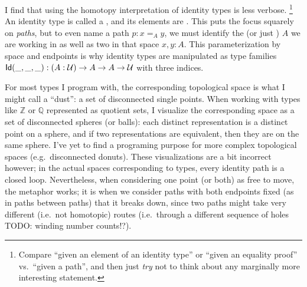 \documentclass[11pt]{article} %
\theoremstyle{definition}
\theoremstyle{remark}
\begin{document}
I find that using the homotopy interpretation of identity types is less verbose.%
  \footnote{Compare ``given an element of an identity type'' or ``given an equality proof'' vs.\ ``given a path'', and then just \emph{try} not to think about any marginally more interesting statement.}
An identity type is called a , and its elements are .
This puts the focus squarely on \emph{paths}, but to even name a path $p : x =_{\!\!A} y$, we must identify the  (or just ) $A$ we are working in as well as two  in that space $x, y : A$.
This parameterization by space and endpoints is why identity types are manipulated as type families $\mathsf{Id}(\_, \_, \_) : ({A}:{\mathcal{U}}) \to A \to A \to \mathcal{U}$ with three indices.

For most types I program with, the corresponding topological space is what I might call a ``dust'': a set of disconnected single points.
When working with types like $\mathbb Z$ or $\mathbb Q$ represented as quotient sets, I visualize the corresponding space as a set of disconnected spheres (or balls): each distinct representation is a distinct point on a sphere, and if two representations are equivalent, then they are on the same sphere.
I've yet to find a programing purpose for more complex topological spaces (e.g.\ disconnected donuts).
These visualizations are a bit incorrect however; in the actual spaces corresponding to types, every identity path is a closed loop.
Nevertheless, when considering one point (or both) as free to move, the metaphor works; it is when we consider paths with both endpoints fixed (as in paths between paths) that it breaks down, since two paths might take very different (i.e.\ not homotopic) routes (i.e.\ through a different sequence of holes TODO: winding number counts!?).
\end{document}
